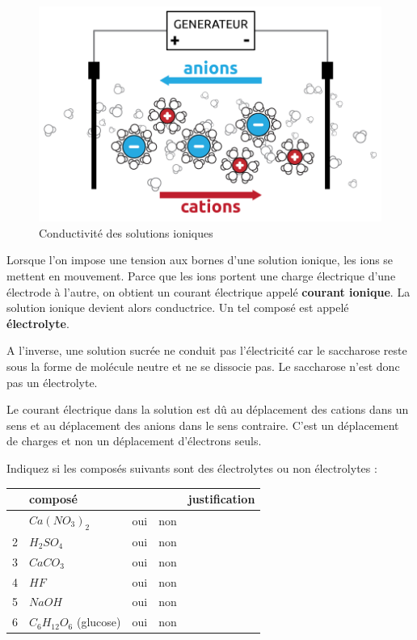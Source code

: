 \documentclass[
  11pt,
  a4paper,
  openany]{book}
\begin{document}
\begin{figure}

{\centering \includegraphics[width=0.5\linewidth]{images/electrolyte-2b} 

}

\caption{Conductivité des solutions ioniques}\label{fig:electrolyte-2b}
\end{figure}

Lorsque l'on impose une tension aux bornes d'une solution ionique, les ions se mettent en mouvement. Parce que les ions portent une charge électrique d'une électrode à l'autre, on obtient un courant électrique appelé \textbf{courant ionique}. La solution ionique devient alors conductrice. Un tel composé est appelé \textbf{électrolyte}.

A l'inverse, une solution sucrée ne conduit pas l'électricité car le saccharose reste sous la forme de molécule neutre et ne se dissocie pas. Le saccharose n'est donc pas un électrolyte.

Le courant électrique dans la solution est dû au déplacement des cations dans un sens et au déplacement des anions dans le sens contraire. C'est un déplacement de charges et non un déplacement d'électrons seuls.

\begin{Exercise}
Indiquez si les composés suivants sont des électrolytes ou non électrolytes :

\end{Exercise}

\begin{longtable}[]{@{}llccl@{}}
\toprule\noalign{}
& composé & & & justification \\
\midrule\noalign{}
\endhead
\bottomrule\noalign{}
\endlastfoot
1 & \(Ca(NO_3)_2\) & oui & non & \\
2 & \(H_2SO_4\) & oui & non & \\
3 & \(CaCO_3\) & oui & non & \\
4 & \(HF\) & oui & non & \\
5 & \(NaOH\) & oui & non & \\
6 & \(C_6H_{12}O_6\) (glucose) & oui & non & \\
\end{longtable}
\end{document}
